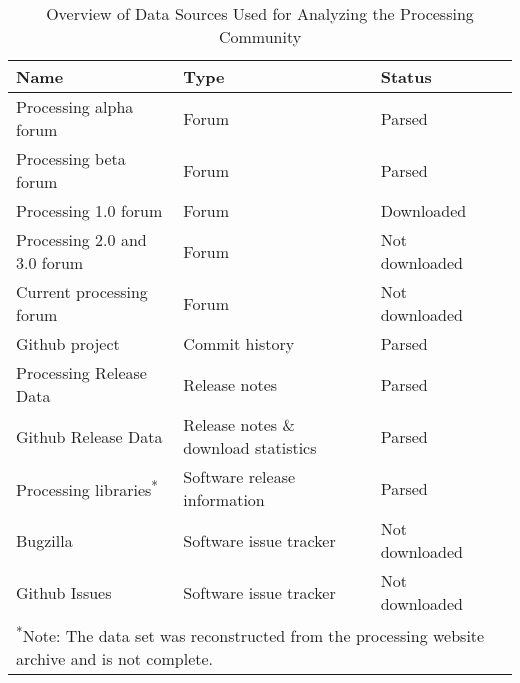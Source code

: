 \begin{table}[h]
    \raggedright
     \label{table:data-sources}
    \begin{tabular}{l l l c}
        \toprule
        Name & Type & Status \\
        \midrule
        Processing alpha forum & Forum & Parsed \\
        Processing beta forum & Forum & Parsed  \\
        Processing 1.0 forum & Forum & Downloaded \\
        Processing 2.0 and 3.0 forum & Forum  & Not downloaded \\
        Current processing forum & Forum & Not downloaded\\
        Github project & Commit history & Parsed \\
        Processing Release Data & Release notes & Parsed \\
        Github Release Data & Release notes \& download statistics & Parsed \\
        Processing libraries\textsuperscript{*} & Software release information & Parsed \\
        Bugzilla & Software issue tracker & Not downloaded \\
        Github Issues & Software issue tracker & Not downloaded \\
        \bottomrule
        \multicolumn{3}{l}{\footnotesize \textsuperscript{*}Note: The data set was reconstructed from the processing website archive and is not complete.}
    \end{tabular}
    \caption{Overview of Data Sources Used for Analyzing the Processing Community}
 
  \end{table}
